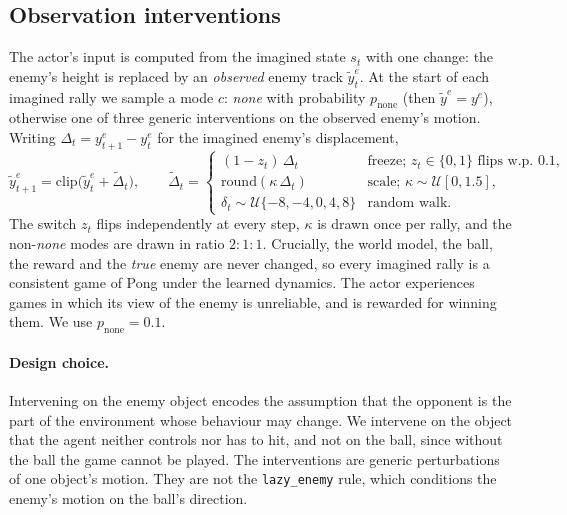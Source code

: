 \documentclass{article}
\newcommand{\lazy}{\texttt{lazy\_enemy}}
\begin{document}
\subsection{Observation interventions}
\label{sec:obsint}

The actor's input is computed from the imagined state $s_t$ with one change: the enemy's height is
replaced by an \emph{observed} enemy track $\tilde y^{e}_t$. At the start of each imagined rally we
sample a mode $c$: \emph{none} with probability $p_{\text{none}}$ (then $\tilde y^{e}=y^{e}$), otherwise
one of three generic interventions on the observed enemy's motion. Writing
$\Delta_t = y^{e}_{t+1}-y^{e}_t$ for the imagined enemy's displacement,
\begin{equation}
  \tilde y^{e}_{t+1} = \mathrm{clip}\big(\tilde y^{e}_t + \tilde\Delta_t\big),\qquad
  \tilde\Delta_t = \begin{cases}
     (1-z_t)\,\Delta_t & \text{freeze; } z_t\in\{0,1\}\text{ flips w.p. } 0.1,\\
     \mathrm{round}(\kappa\,\Delta_t) & \text{scale; } \kappa\sim\mathcal{U}[0,1.5],\\
     \delta_t\sim\mathcal{U}\{-8,-4,0,4,8\} & \text{random walk.}
  \end{cases}
  \label{eq:obsint}
\end{equation}
The switch $z_t$ flips independently at every step, $\kappa$ is drawn once per rally, and the
non-\emph{none} modes are drawn in ratio $2{:}1{:}1$. Crucially, the world model, the ball, the
reward and the \emph{true} enemy are never changed, so every imagined rally is a consistent game of
Pong under the learned dynamics. The actor experiences games in which its view of the enemy is
unreliable, and is rewarded for winning them. We use $p_{\text{none}}=0.1$.

\paragraph{Design choice.} Intervening on the enemy object encodes the assumption that the opponent is
the part of the environment whose behaviour may change. We intervene on the object that the agent
neither controls nor has to hit, and not on the ball, since without the ball the game cannot be
played. The interventions are generic perturbations of one object's motion. They are not the \lazy{}
rule, which conditions the enemy's motion on the ball's direction.
\end{document}
